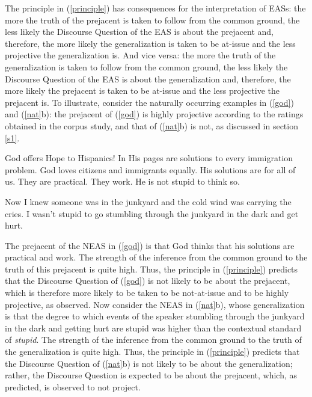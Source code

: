 \documentclass[11pt,fleqn]{article}
\newcommand{\6}{\mbox{$[\hspace*{-.6mm}[$}}
\newcommand{\9}{\mbox{$]\hspace*{-.6mm}]$}}
\begin{document}
The principle in (\ref{principle}) has consequences for the interpretation of EASs: the more the truth of the prejacent is taken to follow from the common ground, the less likely the Discourse Question of the EAS is about the prejacent and, therefore, the more likely the generalization is taken to be at-issue and the less projective the generalization is. And vice versa: the more the truth of the generalization is taken to follow from the common ground, the less likely the Discourse Question of the EAS is about the generalization and, therefore, the more likely the prejacent is taken to be at-issue and the less projective the prejacent is. To illustrate, consider the naturally occurring examples in (\ref{god}) and (\ref{nat}b): the prejacent of (\ref{god}) is highly projective according to the ratings obtained in the corpus study, and that of (\ref{nat}b) is not, as discussed in section \ref{s1}.

\begin{exe}

\ex\label{god} God offers Hope to Hispanics! In His pages are solutions to every immigration problem. God loves citizens and immigrants equally. His solutions are for all of us. They are practical. They work. He is not stupid to think so.

  Now I knew someone was in the junkyard and the cold wind was
carrying the cries. I wasn't stupid to go stumbling through the
junkyard in the dark and get hurt.

\end{exe}
The prejacent of the NEAS in (\ref{god}) is that God thinks that his solutions are practical and work. The strength of the inference from the common ground to the truth of this prejacent is quite high. Thus, the principle in (\ref{principle}) predicts that the Discourse Question of (\ref{god}) is not likely to be about the prejacent, which is therefore more likely to be taken to be not-at-issue and to be highly projective, as observed. Now consider the NEAS in (\ref{nat}b), whose generalization is that the degree to which events of the speaker stumbling through the junkyard in the dark and getting hurt are stupid was higher than the contextual standard of {\em stupid}. The strength of the inference from the common ground to the truth of the generalization is quite high. Thus, the principle in (\ref{principle}) predicts that the Discourse Question of (\ref{nat}b) is not likely to be about the generalization; rather, the Discourse Question is expected to be about the prejacent, which, as predicted, is observed to not project. 
\end{document}

